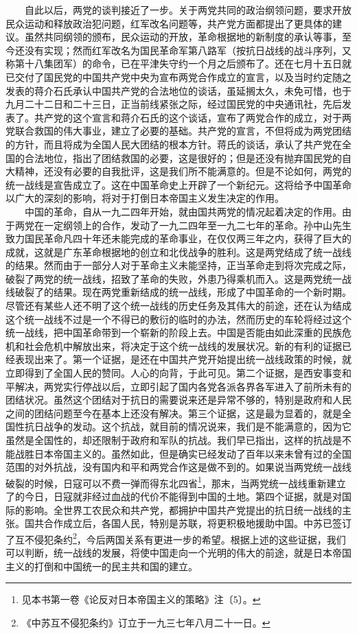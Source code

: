 \documentclass[cn,11pt,chinese]{elegantbook}
\begin{document}
　　自此以后，两党的谈判接近了一步。关于两党共同的政治纲领问题，要求开放民众运动和释放政治犯问题，红军改名问题等，共产党方面都提出了更具体的建议。虽然共同纲领的颁布，民众运动的开放，革命根据地的新制度的承认等事，至今还没有实现；然而红军改名为国民革命军第八路军（按抗日战线的战斗序列，又称第十八集团军）的命令，已在平津失守约一个月之后颁布了。还在七月十五日就已交付了国民党的中国共产党中央为宣布两党合作成立的宣言，以及当时约定随之发表的蒋介石氏承认中国共产党的合法地位的谈话，虽延搁太久，未免可惜，也于九月二十二日和二十三日，正当前线紧张之际，经过国民党的中央通讯社，先后发表了。共产党的这个宣言和蒋介石氏的这个谈话，宣布了两党合作的成立，对于两党联合救国的伟大事业，建立了必要的基础。共产党的宣言，不但将成为两党团结的方针，而且将成为全国人民大团结的根本方针。蒋氏的谈话，承认了共产党在全国的合法地位，指出了团结救国的必要，这是很好的；但是还没有抛弃国民党的自大精神，还没有必要的自我批评，这是我们所不能满意的。但是不论如何，两党的统一战线是宣告成立了。这在中国革命史上开辟了一个新纪元。这将给予中国革命以广大的深刻的影响，将对于打倒日本帝国主义发生决定的作用。\\
　　中国的革命，自从一九二四年开始，就由国共两党的情况起着决定的作用。由于两党在一定纲领上的合作，发动了一九二四年至一九二七年的革命。孙中山先生致力国民革命凡四十年还未能完成的革命事业，在仅仅两三年之内，获得了巨大的成就，这就是广东革命根据地的创立和北伐战争的胜利。这是两党结成了统一战线的结果。然而由于一部分人对于革命主义未能坚持，正当革命走到将次完成之际，破裂了两党的统一战线，招致了革命的失败，外患乃得乘机而入。这是两党统一战线破裂了的结果。现在两党重新结成的统一战线，形成了中国革命的一个新时期。尽管还有某些人还不明了这个统一战线的历史任务及其伟大的前途，还在认为结成这个统一战线不过是一个不得已的敷衍的临时的办法，然而历史的车轮将经过这个统一战线，把中国革命带到一个崭新的阶段上去。中国是否能由如此深重的民族危机和社会危机中解放出来，将决定于这个统一战线的发展状况。新的有利的证据已经表现出来了。第一个证据，是还在中国共产党开始提出统一战线政策的时候，就立即得到了全国人民的赞同。人心的向背，于此可见。第二个证据，是西安事变和平解决，两党实行停战以后，立即引起了国内各党各派各界各军进入了前所未有的团结状况。虽然这个团结对于抗日的需要说来还是异常不够的，特别是政府和人民之间的团结问题至今在基本上还没有解决。第三个证据，这是最为显着的，就是全国性抗日战争的发动。这个抗战，就目前的情况说来，我们是不能满意的，因为它虽然是全国性的，却还限制于政府和军队的抗战。我们早已指出，这样的抗战是不能战胜日本帝国主义的。虽然如此，但是确实已经发动了百年以来未曾有过的全国范围的对外抗战，没有国内和平和两党合作这是做不到的。如果说当两党统一战线破裂的时候，日寇可以不费一弹而得东北四省\footnote[8]{ 见本书第一卷《论反对日本帝国主义的策略》注〔5〕。}，那末，当两党统一战线重新建立了的今日，日寇就非经过血战的代价不能得到中国的土地。第四个证据，就是对国际的影响。全世界工农民众和共产党，都拥护中国共产党提出的抗日统一战线的主张。国共合作成立后，各国人民，特别是苏联，将更积极地援助中国。中苏已签订了互不侵犯条约\footnote[9]{ 《中苏互不侵犯条约》订立于一九三七年八月二十一日。}，今后两国关系有更进一步的希望。根据上述的这些证据，我们可以判断，统一战线的发展，将使中国走向一个光明的伟大的前途，就是日本帝国主义的打倒和中国统一的民主共和国的建立。\\
\end{document}
